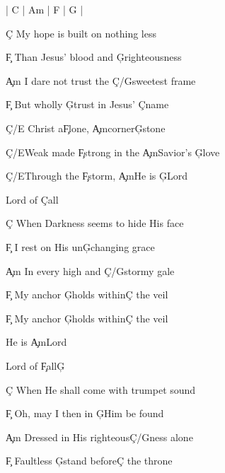 \documentclass[9pt]{extarticle}
\begin{document}
\bsong

\bi
| C | Am | F | G |
\ei

\bv
\c{C} My hope is built on nothing less

\c{F} Than Jesus' blood and \c{G}righteousness

\c{Am} I dare not trust the \c{C/G}sweetest frame

\c{F} But wholly \c{G}trust in Jesus' \c{C}name
\ev

\bc
\c{C/E} Christ a\c{F}lone, \c{Am}corner\c{G}stone

\c{C/E}Weak made \c{F}strong in the \c{Am}Savior's \c{G}love

\c{C/E}Through the \c{F}storm, \c{Am}He is \c{G}Lord

Lord of \c{C}all
\ec

\bv
\c{C} When Darkness seems to hide His face

\c{F} I rest on His un\c{G}changing grace

\c{Am} In every high and \c{C/G}stormy gale

\c{F} My anchor \c{G}holds within\c{C} the veil

\c{F} My anchor \c{G}holds within\c{C} the veil
\ev


\bt
He is \c{Am}Lord

Lord of \c{F}all\c{G}
\et


\bv
\c{C} When He shall come with trumpet sound

\c{F} Oh, may I then in \c{G}Him be found

\c{Am} Dressed in His righteous\c{C/G}ness alone

\c{F} Faultless \c{G}stand before\c{C} the throne
\ev


\esong
\end{document}

